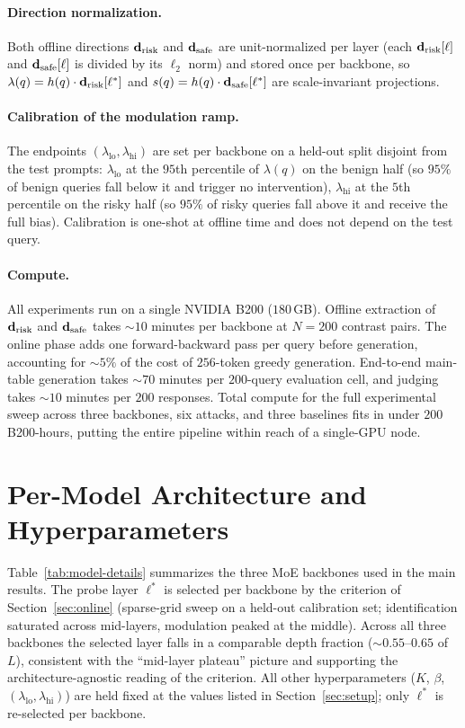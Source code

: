 \paragraph{Direction normalization.} Both offline directions $\mathbf{d}_{\text{risk}}$ and $\mathbf{d}_{\text{safe}}$ are unit-normalized per layer (each $\mathbf{d}_{\text{risk}}[\ell]$ and $\mathbf{d}_{\text{safe}}[\ell]$ is divided by its $\ell_2$ norm) and stored once per backbone, so $\lambda(q) = h(q) \cdot \mathbf{d}_{\text{risk}}[\ell^*]$ and $s(q) = h(q) \cdot \mathbf{d}_{\text{safe}}[\ell^*]$ are scale-invariant projections.

\paragraph{Calibration of the modulation ramp.} The endpoints $(\lambda_{\text{lo}}, \lambda_{\text{hi}})$ are set per backbone on a held-out split disjoint from the test prompts: $\lambda_{\text{lo}}$ at the $95$th percentile of $\lambda(q)$ on the benign half (so $95\%$ of benign queries fall below it and trigger no intervention), $\lambda_{\text{hi}}$ at the $5$th percentile on the risky half (so $95\%$ of risky queries fall above it and receive the full bias). Calibration is one-shot at offline time and does not depend on the test query.

\paragraph{Compute.} All experiments run on a single NVIDIA B200 ($180$\,GB). Offline extraction of $\mathbf{d}_{\text{risk}}$ and $\mathbf{d}_{\text{safe}}$ takes ${\sim}10$ minutes per backbone at $N{=}200$ contrast pairs. The online phase adds one forward-backward pass per query before generation, accounting for ${\sim}5\%$ of the cost of $256$-token greedy generation. End-to-end main-table generation takes ${\sim}70$ minutes per $200$-query evaluation cell, and judging takes ${\sim}10$ minutes per $200$ responses. Total compute for the full experimental sweep across three backbones, six attacks, and three baselines fits in under $200$ B200-hours, putting the entire pipeline within reach of a single-GPU node.

\section{Per-Model Architecture and Hyperparameters}
\label{app:model-details}

Table~\ref{tab:model-details} summarizes the three MoE backbones used in the main results. The probe layer $\ell^*$ is selected per backbone by the criterion of Section~\ref{sec:online} (sparse-grid sweep on a held-out calibration set; identification saturated across mid-layers, modulation peaked at the middle). Across all three backbones the selected layer falls in a comparable depth fraction ($\sim$$0.55$--$0.65$ of $L$), consistent with the ``mid-layer plateau'' picture and supporting the architecture-agnostic reading of the criterion. All other hyperparameters ($K$, $\beta$, $(\lambda_{\text{lo}}, \lambda_{\text{hi}})$) are held fixed at the values listed in Section~\ref{sec:setup}; only $\ell^*$ is re-selected per backbone.

